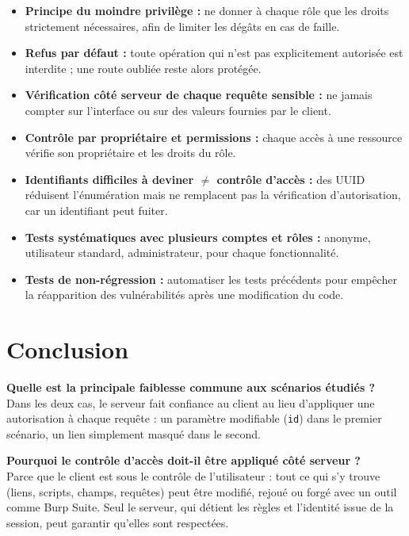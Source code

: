 \documentclass{rapportENSIAS}
\begin{document}
\begin{itemize}
  \item \textbf{Principe du moindre privilège :} ne donner à chaque rôle que les droits strictement nécessaires, afin de limiter les dégâts en cas de faille.
  \item \textbf{Refus par défaut :} toute opération qui n'est pas explicitement autorisée est interdite ; une route oubliée reste alors protégée.
  \item \textbf{Vérification côté serveur de chaque requête sensible :} ne jamais compter sur l'interface ou sur des valeurs fournies par le client.
  \item \textbf{Contrôle par propriétaire et permissions :} chaque accès à une ressource vérifie son propriétaire et les droits du rôle.
  \item \textbf{Identifiants difficiles à deviner $\neq$ contrôle d'accès :} des UUID réduisent l'énumération mais ne remplacent pas la vérification d'autorisation, car un identifiant peut fuiter.
  \item \textbf{Tests systématiques avec plusieurs comptes et rôles :} anonyme, utilisateur standard, administrateur, pour chaque fonctionnalité.
  \item \textbf{Tests de non-régression :} automatiser les tests précédents pour empêcher la réapparition des vulnérabilités après une modification du code.
\end{itemize}

\section{Conclusion}

\textbf{Quelle est la principale faiblesse commune aux scénarios étudiés ?}\\
Dans les deux cas, le serveur fait confiance au client au lieu d'appliquer une autorisation à chaque requête : un paramètre modifiable (\texttt{id}) dans le premier scénario, un lien simplement masqué dans le second.

\textbf{Pourquoi le contrôle d'accès doit-il être appliqué côté serveur ?}\\
Parce que le client est sous le contrôle de l'utilisateur : tout ce qui s'y trouve (liens, scripts, champs, requêtes) peut être modifié, rejoué ou forgé avec un outil comme Burp Suite. Seul le serveur, qui détient les règles et l'identité issue de la session, peut garantir qu'elles sont respectées.
\end{document}
